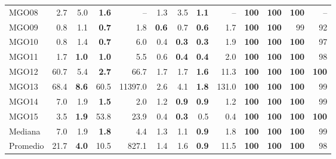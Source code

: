 \begin{table}[!htbp]
{\begin{tabular}{l rrrr | rrrr | rrrr}
MGO08 & 2.7 & 5.0 & \textbf{1.6} & -- & 1.3 & 3.5 & \textbf{1.1} & -- & \textbf{100} & \textbf{100} & \textbf{100} & -- \\
MGO09 & 0.8 & 1.1 & \textbf{0.7} & 1.8 & \textbf{0.6} & 0.7 & \textbf{0.6} & 1.7 & \textbf{100} & \textbf{100} & 99 & 92 \\
MGO10 & 0.8 & 1.4 & \textbf{0.7} & 6.0 & 0.4 & \textbf{0.3} & \textbf{0.3} & 1.9 & \textbf{100} & \textbf{100} & \textbf{100} & 97 \\
MGO11 & 1.7 & \textbf{1.0} & \textbf{1.0} & 5.5 & 0.6 & \textbf{0.4} & \textbf{0.4} & 2.0 & \textbf{100} & \textbf{100} & \textbf{100} & 98 \\
MGO12 & 60.7 & 5.4 & \textbf{2.7} & 66.7 & 1.7 & 1.7 & \textbf{1.6} & 11.3 & \textbf{100} & \textbf{100} & \textbf{100} & \textbf{100} \\
MGO13 & 68.4 & \textbf{8.6} & 60.5 & 11397.0 & 2.6 & 4.1 & \textbf{1.8} & 131.0 & \textbf{100} & \textbf{100} & \textbf{100} & 99 \\
MGO14 & 7.0 & 1.9 & \textbf{1.5} & 2.0 & 1.2 & \textbf{0.9} & \textbf{0.9} & 1.2 & \textbf{100} & \textbf{100} & \textbf{100} & 99 \\
MGO15 & 3.5 & \textbf{1.9} & 53.8 & 23.9 & 0.4 & \textbf{0.3} & 0.5 & 0.4 & \textbf{100} & \textbf{100} & \textbf{100} & \textbf{100} \\
\midrule
Mediana & 7.0 & 1.9 & \textbf{1.8} & 4.4 & 1.3 & 1.1 & \textbf{0.9} & 1.8 & \textbf{100} & \textbf{100} & \textbf{100} & 99 \\
Promedio & 21.7 & \textbf{4.0} & 10.5 & 827.1 & 1.4 & 1.6 & \textbf{0.9} & 11.5 & \textbf{100} & \textbf{100} & \textbf{100} & 98 \\
\bottomrule
\end{tabular}
}
\end{table}

